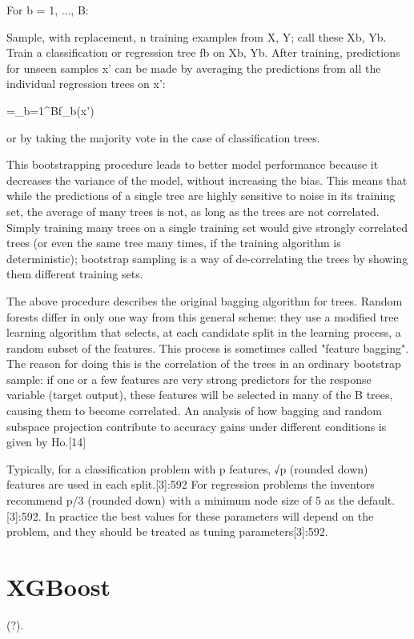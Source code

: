 For b = 1, ..., B:

Sample, with replacement, n training examples from X, Y; call these Xb, Yb.
Train a classification or regression tree fb on Xb, Yb.
After training, predictions for unseen samples x' can be made by averaging the predictions from all the individual regression trees on x':

{={}\sum _{b=1}^{B}f_{b}(x')}

or by taking the majority vote in the case of classification trees.

This bootstrapping procedure leads to better model performance because it decreases the variance of the model, without increasing the bias. This means that while the predictions of a single tree are highly sensitive to noise in its training set, the average of many trees is not, as long as the trees are not correlated. Simply training many trees on a single training set would give strongly correlated trees (or even the same tree many times, if the training algorithm is deterministic); bootstrap sampling is a way of de-correlating the trees by showing them different training sets.

The above procedure describes the original bagging algorithm for trees. Random forests differ in only one way from this general scheme: they use a modified tree learning algorithm that selects, at each candidate split in the learning process, a random subset of the features. This process is sometimes called "feature bagging". The reason for doing this is the correlation of the trees in an ordinary bootstrap sample: if one or a few features are very strong predictors for the response variable (target output), these features will be selected in many of the B trees, causing them to become correlated. An analysis of how bagging and random subspace projection contribute to accuracy gains under different conditions is given by Ho.[14]

Typically, for a classification problem with p features, √p (rounded down) features are used in each split.[3]:592 For regression problems the inventors recommend p/3 (rounded down) with a minimum node size of 5 as the default.[3]:592. In practice the best values for these parameters will depend on the problem, and they should be treated as tuning parameters[3]:592.































\section{XGBoost}
\label{sec:xgboost}

(?).

